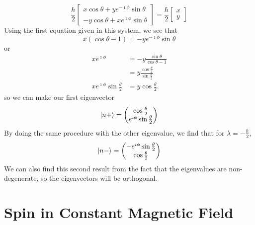 \documentclass[a4paper,twoside]{article}
\begin{document}
\begin{itemize}
\begin{tcolorbox}
    \begin{equation}
        \frac{\hbar}{2} \begin{bmatrix}x\cos\theta+ye^{-\imath\phi}\sin\theta \\ -y\cos\theta + x e^{\imath\phi}\sin\theta \end{bmatrix} = \frac{\hbar}{2}\begin{bmatrix} x\\y \end{bmatrix}
    \end{equation}
    Using the first equation given in this system, we see that
    \begin{equation}
        x(\cos\theta - 1) = -ye^{-\imath\phi}\sin\theta
    \end{equation}
    or
    \begin{align*}
        x e^{\imath\phi} &= -y\frac{\sin\theta}{\cos\theta - 1}\\
        &= y \frac{\cos \frac{\theta}{2}}{\sin \frac{\theta}{2}}\\
        x e^{\imath\phi}\sin \frac{\theta}{2} &= y\cos \frac{\theta}{2}
    .\end{align*}
    so we can make our first eigenvector
    \begin{equation}
        \ket{n+} = \begin{pmatrix} \cos \frac{\theta}{2}\\ e^{\imath\phi}\sin \frac{\theta}{2} \end{pmatrix} 
    \end{equation}
    By doing the same procedure with the other eigenvalue, we find that for $\lambda = -\frac{\hbar}{2}$,
\begin{equation}
    \ket{n-} = \begin{pmatrix} -e^{\imath\phi}\sin \frac{\theta}{2}\\ \cos \frac{\theta}{2} \end{pmatrix} 
\end{equation}
We can also find this second result from the fact that the eigenvalues are non-degenerate, so the eigenvectors will be orthogonal.
\end{tcolorbox}

\end{itemize}

\section{Spin in Constant Magnetic Field}%
\label{sec:spin_in_cons}
\end{document}
